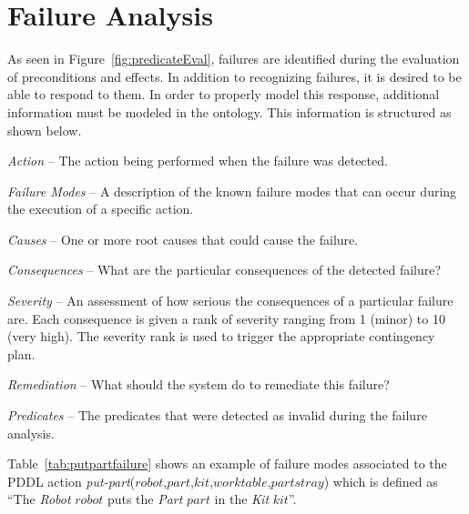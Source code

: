 \section{Failure Analysis}
As seen in Figure~\ref{fig:predicateEval}, failures are identified during the evaluation of preconditions and effects. 
In addition to recognizing failures, it is desired to be able to respond to them.
In order to properly model this response, additional information must be modeled
in the ontology. This information is structured as shown below.
\begin{description}
	\item{\it Action} -- The action being performed when the failure was detected.
	\begin{description}
  		\item{\it Failure Modes} -- A description of the known failure modes that can occur during the execution of a specific action.
  		\begin{description}
			\item{\it Causes} -- One or more root causes that could cause the failure. 
  			\begin{description}
  				\item{\it Consequences} -- What are the particular consequences of the detected failure?
  		   		\item{\it Severity} -- An assessment of how serious the consequences of a particular failure are. Each consequence is given a rank of severity ranging from 1 (minor) to 10 (very high). The severity rank is used to trigger the appropriate contingency plan.
 				\item{\it Remediation} -- What should the system do to remediate this
 				failure?
  			\end{description}
   		\end{description}
  		\item{\it Predicates} -- The predicates that were detected as invalid during the failure analysis.
	\end{description}
\end{description}

Table~\ref{tab:putpartfailure} shows an example of failure modes associated to the PDDL action \textsl{put-part}($\mathit{robot}$,$\mathit{part}$,$\mathit{kit}$,$\mathit{worktable}$,$\mathit{partstray}$) which is defined as ``The \textit{Robot} $\mathit{robot}$ puts the \textit{Part} $\mathit{part}$ in the \textit{Kit} $\mathit{kit}$''.

